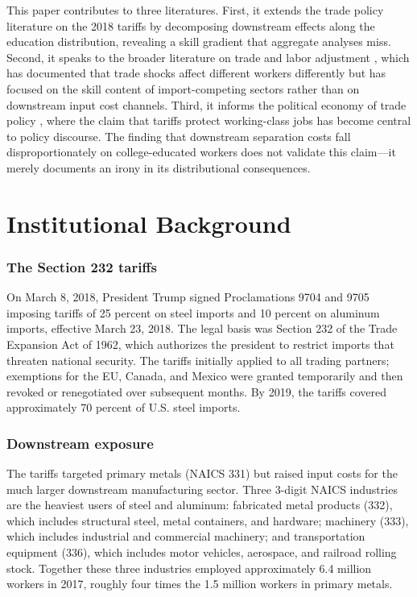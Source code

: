 \documentclass[12pt]{article}
\begin{document}
This paper contributes to three literatures. First, it extends the trade policy literature on the 2018 tariffs \citep{flaaen2019, amiti2019, fajgelbaum2020} by decomposing downstream effects along the education distribution, revealing a skill gradient that aggregate analyses miss. Second, it speaks to the broader literature on trade and labor adjustment \citep{autor2013, autor2014, dix-carneiro2017}, which has documented that trade shocks affect different workers differently but has focused on the skill content of import-competing sectors rather than on downstream input cost channels. Third, it informs the political economy of trade policy \citep{grossman1994, autor2020}, where the claim that tariffs protect working-class jobs has become central to policy discourse. The finding that downstream separation costs fall disproportionately on college-educated workers does not validate this claim---it merely documents an irony in its distributional consequences.

\section{Institutional Background}

\subsubsection*{The Section 232 tariffs} On March 8, 2018, President Trump signed Proclamations 9704 and 9705 imposing tariffs of 25 percent on steel imports and 10 percent on aluminum imports, effective March 23, 2018. The legal basis was Section 232 of the Trade Expansion Act of 1962, which authorizes the president to restrict imports that threaten national security. The tariffs initially applied to all trading partners; exemptions for the EU, Canada, and Mexico were granted temporarily and then revoked or renegotiated over subsequent months. By 2019, the tariffs covered approximately 70 percent of U.S. steel imports.

\subsubsection*{Downstream exposure} The tariffs targeted primary metals (NAICS 331) but raised input costs for the much larger downstream manufacturing sector. Three 3-digit NAICS industries are the heaviest users of steel and aluminum: fabricated metal products (332), which includes structural steel, metal containers, and hardware; machinery (333), which includes industrial and commercial machinery; and transportation equipment (336), which includes motor vehicles, aerospace, and railroad rolling stock. Together these three industries employed approximately 6.4 million workers in 2017, roughly four times the 1.5 million workers in primary metals.
\end{document}
